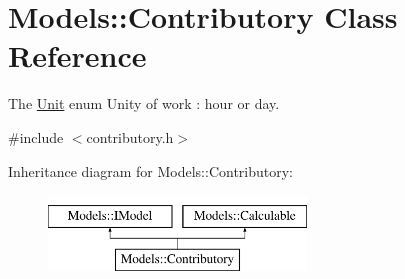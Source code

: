 \hypertarget{classModels_1_1Contributory}{}\section{Models\+:\+:Contributory Class Reference}
\label{classModels_1_1Contributory}


The \hyperlink{classModels_1_1Unit}{Unit} enum Unity of work \+: hour or day.  




{\ttfamily \#include $<$contributory.\+h$>$}

Inheritance diagram for Models\+:\+:Contributory\+:\begin{figure}[H]
\begin{center}
\leavevmode
\includegraphics[height=2.000000cm]{d5/dd1/classModels_1_1Contributory}
\end{center}
\end{figure}
